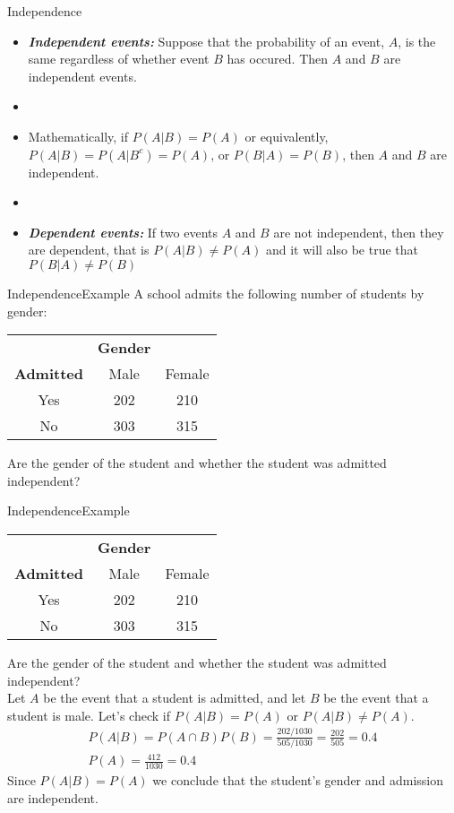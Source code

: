 \documentclass[xcolor=dvipsnames]{beamer}
\begin{document}
\begin{frame}{Independence}
	\begin{itemize}
		\item \textbf{\emph{Independent events:}} Suppose that the probability of an event, $A$, is the same regardless of whether event $B$ has occured. Then $A$ and $B$ are independent events.
		\item[]
		\item Mathematically, if $P(A|B) = P(A)$ or equivalently, $P(A|B) = P(A|B^c) = P(A)$, or $P(B|A) = P(B)$, then $A$ and $B$ are independent.  
		\item[]
		\item \textbf{\emph{Dependent events:}} If two events $A$ and $B$ are not independent, then they are dependent, that is $P(A|B) \neq P(A)$ and it will also be true that $P(B|A) \neq P(B)$
	\end{itemize}
\end{frame}

\begin{frame}{Independence}{Example}
A school admits the following number of students by gender:
\begin{center}
		\begin{tabular}{c|cc}
		& \textbf{Gender} & \\
		\textbf{Admitted} & Male & Female \\ \hline
		Yes & 202 & 210 \\
		No & 303 & 315
	\end{tabular}
\end{center}
Are the gender of the student and whether the student was admitted independent?
\end{frame}

\begin{frame}{Independence}{Example}
\begin{center}
	\begin{tabular}{c|cc}
		& \textbf{Gender} & \\
		\textbf{Admitted} & Male & Female \\ \hline
		Yes & 202 & 210 \\
		No & 303 & 315
	\end{tabular}
\end{center}
Are the gender of the student and whether the student was admitted independent? \\ 
Let $A$ be the event that a student is admitted, and let $B$ be the event that a student is male. Let's check if $P(A|B) = P(A)$ or $P(A|B) \neq P(A)$.
\begin{gather*}
	P(A|B) = P(A \cap B) P(B) = \frac{202/1030}{505/1030}= \frac{202}{505} = 0.4 \\
	P(A) = \frac{412}{1030} = 0.4
\end{gather*}
Since $P(A|B) = P(A)$ we conclude that the student's gender and admission are independent. 
\end{frame}
\end{document}
